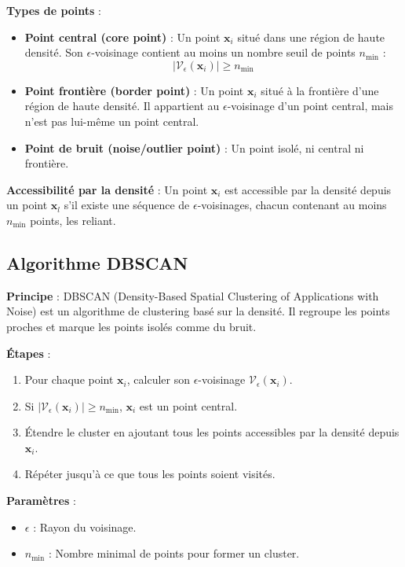 \documentclass[10pt,a4paper]{article}
\begin{document}
\textbf{Types de points} :
\begin{itemize}
    \item \textbf{Point central (core point)} : Un point $\mathbf{x}_i$ situé dans une région de haute densité. Son $\epsilon$-voisinage contient au moins un nombre seuil de points $n_{\text{min}}$ :
    $$|\mathcal{V}_{\epsilon}(\mathbf{x}_i)| \geq n_{\text{min}}$$
    \item \textbf{Point frontière (border point)} : Un point $\mathbf{x}_i$ situé à la frontière d'une région de haute densité. Il appartient au $\epsilon$-voisinage d'un point central, mais n'est pas lui-même un point central.
    \item \textbf{Point de bruit (noise/outlier point)} : Un point isolé, ni central ni frontière.
\end{itemize}

\textbf{Accessibilité par la densité} :
Un point $\mathbf{x}_i$ est accessible par la densité depuis un point $\mathbf{x}_l$ s'il existe une séquence de $\epsilon$-voisinages, chacun contenant au moins $n_{\text{min}}$ points, les reliant.

\subsection*{Algorithme DBSCAN}

\textbf{Principe} :
DBSCAN (Density-Based Spatial Clustering of Applications with Noise) est un algorithme de clustering basé sur la densité. Il regroupe les points proches et marque les points isolés comme du bruit.

\textbf{Étapes} :
\begin{enumerate}
    \item Pour chaque point $\mathbf{x}_i$, calculer son $\epsilon$-voisinage $\mathcal{V}_{\epsilon}(\mathbf{x}_i)$.
    \item Si $|\mathcal{V}_{\epsilon}(\mathbf{x}_i)| \geq n_{\text{min}}$, $\mathbf{x}_i$ est un point central.
    \item Étendre le cluster en ajoutant tous les points accessibles par la densité depuis $\mathbf{x}_i$.
    \item Répéter jusqu'à ce que tous les points soient visités.
\end{enumerate}

\textbf{Paramètres} :
\begin{itemize}
    \item $\epsilon$ : Rayon du voisinage.
    \item $n_{\text{min}}$ : Nombre minimal de points pour former un cluster.
\end{itemize}
\end{document}
